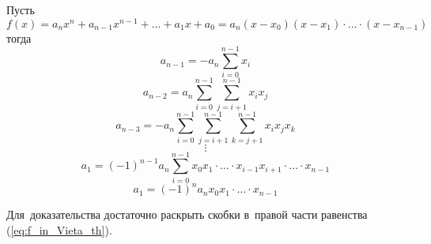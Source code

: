 \begin{theorem}
Пусть 
\begin{equation}
\label{eq:f_in_Vieta_th}
f(x) = a_n x^n + a_{n-1} x^{n-1} + \ldots + a_1 x + a_0 = a_n(x - x_0)(x - x_1) \cdot \ldots \cdot (x - x_{n-1})
\end{equation}
тогда
\begin{equation*}
a_{n-1} = -a_n \sum_{i=0}^{n-1} x_i
\end{equation*}
\begin{equation*}
a_{n-2} = a_n \sum_{i=0}^{n-1} \sum_{j=i+1}^{n-1} x_i x_j
\end{equation*}
\begin{equation*}
a_{n-3} = -a_n \sum_{i=0}^{n-1} \sum_{j=i+1}^{n-1} \sum_{k=j+1}^{n-1} x_i x_j x_k
\end{equation*}
\begin{equation*}
\vdots
\end{equation*}
\begin{equation*}
a_1 = (-1)^{n-1} a_n \sum_{i=0}^{n-1} x_0 x_1 \cdot \ldots \cdot x_{i-1} x_{i+1} \cdot \ldots \cdot x_{n-1}
\end{equation*}
\begin{equation*}
a_1 = (-1)^n a_n x_0 x_1 \cdot \ldots \cdot x_{n-1}
\end{equation*}
\end{theorem}%
Для~доказательства достаточно раскрыть скобки в~правой части равенства (\ref{eq:f_in_Vieta_th}).